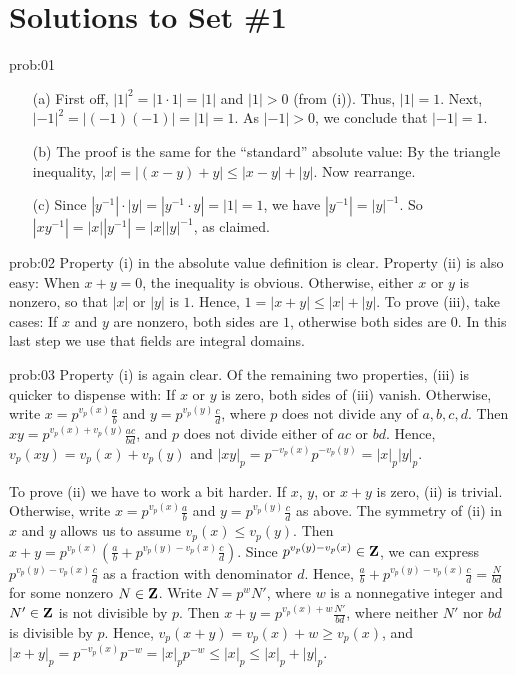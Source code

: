 
\chapter*{Solutions to Set \#1}
\label{set0sols}

\begin{sol}{prob:01} 
    \begin{enumerate}
        \item[(a)] First off, $|1|^2 = |1\cdot 1|=|1|$ and $|1| > 0$ (from (i)). Thus, $|1| = 1$. Next, $|-1|^2 = |(-1) (-1)| = |1| = 1$. As $|-1| > 0$, we conclude that $|-1|=1$.
\item[(b)] The proof is the same for the ``standard'' absolute value: By the triangle inequality, $|x| = |(x-y)+y| \le |x-y| + |y|$. Now rearrange.
\item[(c)] Since $|y^{-1}|\cdot |y|= |y^{-1}\cdot y| = |1| = 1$, we have $|y^{-1}| = |y|^{-1}$. So $|xy^{-1}| = |x||y^{-1}| = |x||y|^{-1}$, as claimed.
    \end{enumerate}
\end{sol}

\begin{sol}{prob:02}  Property (i) in the absolute value definition is clear. Property (ii) is also easy: When $x+y=0$, the inequality is obvious. Otherwise, either $x$ or $y$ is nonzero, so that $|x|$ or $|y|$ is $1$. Hence, $1= |x+y| \le |x| + |y|$. To prove (iii), take cases: If $x$ and $y$ are nonzero, both sides are $1$, otherwise both sides are $0$. In this last step we use that fields are integral domains.
\end{sol}

\begin{sol}{prob:03} Property (i) is again clear. Of the remaining two properties, (iii) is quicker to dispense with: If $x$ or $y$ is zero, both sides of (iii) vanish. Otherwise, write $x= p^{v_p(x)} \frac{a}{b}$ and $y=p^{v_p(y)} \frac{c}{d}$, where $p$ does not divide any of $a,b,c,d$. Then $xy = p^{v_p(x)+v_p(y)} \frac{ac}{bd}$, and $p$ does not divide either of $ac$ or $bd$. Hence, $v_p(xy) = v_p(x) + v_p(y)$ and $|xy|_p = p^{-v_p(x)} p^{-v_p(y)} = |x|_p |y|_p$.

To prove (ii) we have to work a bit harder. If $x$, $y$, or $x+y$ is zero, (ii) is trivial. Otherwise, write $x= p^{v_p(x)} \frac{a}{b}$ and $y=p^{v_p(y)} \frac{c}{d}$ as above. The symmetry of (ii) in $x$ and $y$ allows us to assume $v_p(x) \le v_p(y)$. Then $x+y= p^{v_p(x)} \left(\frac{a}{b} + p^{v_p(y)-v_p(x)} \frac{c}{d}\right)$. Since $p^{v_p(y)-v_p(x)}\in \mathbf{Z}$, we can express $p^{v_p(y)-v_p(x)}\frac{c}{d}$ as a fraction with denominator $d$. Hence, $\frac{a}{b} + p^{v_p(y)-v_p(x)} \frac{c}{d} = \frac{N}{bd}$ for some nonzero $N\in \mathbf{Z}$. Write $N = p^{w} N'$, where $w$ is a nonnegative integer and $N'\in \mathbf{Z}$ is not divisible by $p$. Then $x+y = p^{v_p(x)+w} \frac{N'}{bd}$, where neither $N'$ nor $bd$ is divisible by $p$. Hence, $v_p(x+y) = v_p(x) + w \ge v_p(x)$, and $|x+y|_{p} = p^{-v_p(x)} p^{-w} = |x|_p p^{-w} \le |x|_p \le |x|_p + |y|_p$.
\end{sol}



